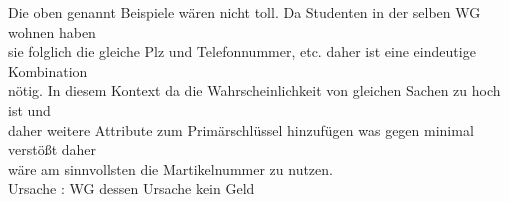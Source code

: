 \documentclass{article}
\begin{document}
\begin{enumerate}
\begin{enumerate}
                    Die oben genannt Beispiele wären nicht toll. Da Studenten in der selben WG wohnen haben \\
                    sie folglich die gleiche Plz und Telefonnummer, etc. daher ist eine eindeutige Kombination \\
                    nötig. In diesem Kontext da die Wahrscheinlichkeit von gleichen Sachen zu hoch ist und\\
                     daher weitere Attribute zum Primärschlüssel hinzufügen was gegen minimal verstößt daher \\
                     wäre am sinnvollsten die Martikelnummer zu nutzen. \\
                    Ursache : WG dessen Ursache kein Geld  
            \end{enumerate}
    \end{enumerate}
\end{document}
